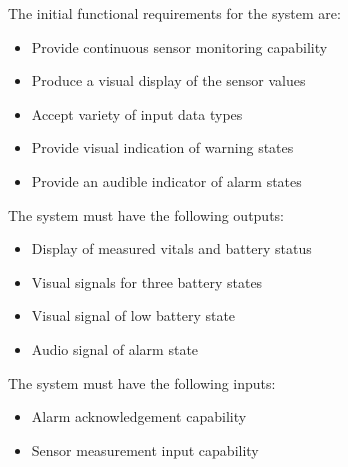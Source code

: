 \documentclass[12pt]{article} %
\begin{document}
\begin{itemize}[$$]
  \item The initial functional requirements for the system are:

    \begin{itemize}[$\bullet$]
      \item Provide continuous sensor monitoring capability
      \item Produce a visual display of the sensor values
      \item Accept variety of input data types
      \item Provide visual indication of warning states
      \item Provide an audible indicator of alarm states
    \end{itemize}
\end{itemize}

\begin{itemize}[$$] 
  \item The system must have the following outputs:
    \begin{itemize}[$\bullet$]
      \item Display of measured vitals and battery status
      \item Visual signals for three battery states
      \item Visual signal of low battery state
      \item Audio signal of alarm state
    \end{itemize}
\end{itemize}

\begin{itemize}[$$]
  \item The system must have the following inputs:
    \begin{itemize}[$\bullet$]
      \item Alarm acknowledgement capability
      \item Sensor measurement input capability
    \end{itemize}
\end{itemize}
\end{document}
